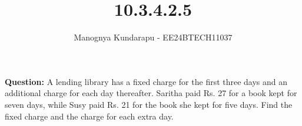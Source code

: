 \documentclass[journal]{IEEEtran}
\begin{document}

\vspace{3cm}

\title{10.3.4.2.5}
\author{Manognya Kundarapu - EE24BTECH11037
}
{\let\newpage\relax\maketitle}

\renewcommand{\thefigure}{\theenumi}
\renewcommand{\thetable}{\theenumi}
\setlength{\intextsep}{10pt} %


\renewcommand{\thetable}{\theenumi}
\textbf{Question:} A lending library has a fixed charge for the first three days and an additional charge for each day thereafter. Saritha paid  Rs. 27 for a book kept for seven days, while Susy
paid  Rs. 21 for the book she kept for five days. Find the fixed charge and the charge
for each extra day.
\end{document}
